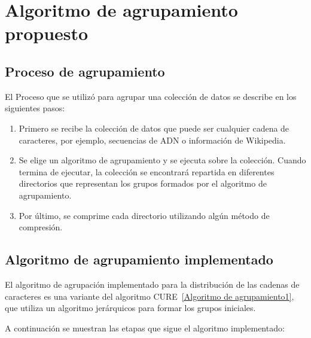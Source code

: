 \chapter{Algoritmo de agrupamiento propuesto}\label{Algoritmo de agrupamiento propuesto}

\section{Proceso de agrupamiento}\label{Proceso de agrupamiento}

El Proceso que se utilizó para agrupar una colección de datos se describe en los siguientes pasos:

\begin{enumerate}
  \item Primero se recibe la colección de datos que puede ser cualquier cadena de caracteres, por ejemplo, secuencias de ADN o información de Wikipedia.
  
  \item Se elige un algoritmo de agrupamiento y se ejecuta sobre la colección. Cuando termina de ejecutar, la colección se encontrará repartida en diferentes directorios que representan los grupos formados por el algoritmo de agrupamiento.

  \item Por último, se comprime cada directorio utilizando algún método de compresión.
  	
\end{enumerate}


\section{Algoritmo de agrupamiento implementado}\label{Algoritmo de agrupamiento implementado}


El algoritmo de agrupación implementado para la distribución de las cadenas de caracteres es una variante del algoritmo CURE~\ref{Algoritmo de agrupamiento1}, que utiliza un algoritmo jerárquicos para formar los grupos iniciales.

A continuación se muestran las etapas que sigue el algoritmo implementado:

